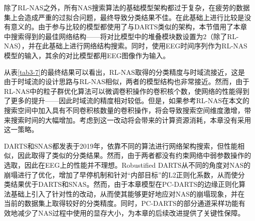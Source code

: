 \begin{table*}[!h]
\caption{不同NAS算法在疲劳驾驶检测数据集上的LOSO分类结果（平均值\%/标准差）}  \label{tab3-7}
\centering
{}
\end{table*}

除了RL-NAS之外，所有NAS搜索算法的基础模型架构都过于复杂，在疲劳的数据集上会造成严重的过拟合问题，最终导致分类结果不佳。在此基础上进行比较是没有意义的。由于参与比较的模型都使用了与DARTS类似的架构，本节借用了本章中搜索得到的最佳网络结构——将对比模型中的堆叠模块数设置为2（除了RL-NAS），并在此基础上进行网络结构搜索。同时，使用EEG时间序列作为RL-NAS模型的输入，其余的对比模型都用EEG图像作为输入。

从表\ref{tab3-7}的最终结果可以看出，RL-NAS取得的分类精度与时域流接近，这是由于时域流的设计思路与RL-NAS相似，两者的模型结构也非常接近。然而，由于RL-NAS中的粒子群优化算法可以微调卷积操作的卷积核个数，使网络的性能得到了更多的提升——因此时域流的精度相对较低。但是，如果参考RL-NAS在本文的搜索空间中加入具有不同卷积核数量的卷积操作，将会导致搜索空间维度激增，带来搜索时间的大幅增加。考虑到这一改动将会带来的计算资源消耗，本章没有采用这一策略。

DARTS和SNAS都发表于2019年，依靠不同的算法进行网络架构搜索，但性能相似，因此取得了类似的分类结果。然而，由于两者都没有约束网络中弱参数操作的选取，因此在EEG上的性能并不理想。Robustified DARTS从不同的角度对NAS的崩塌进行了优化，增加了早停机制和针对“内部目标”的L2正则化系数，从而使分类结果优于DARTS和SNAS。然而，由于本章模型在PC-DARTS的边缘正则化算法基础上引入了针对性的改动，从而使其能够更好地应对NAS的崩塌现象，并在当前的数据集上取得较好的分类精度。同时，PC-DARTS的部分通道采样功能有效地减少了NAS过程中使用的显存大小，为本章的后续改进提供了关键性保障。

